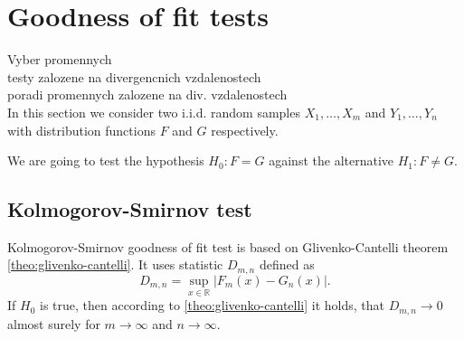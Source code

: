 \chapter{Goodness of fit tests}
\label{ch:GoF}

Vyber promennych \\
testy zalozene na divergencnich vzdalenostech \\
poradi promennych zalozene na div. vzdalenostech\\


In this section we consider two i.i.d. random samples $X_1,\ldots, X_m$ and $Y_1, \ldots, Y_n$ with distribution functions $F$ and $G$ respectively. 

We are going to test the hypothesis $H_0: F = G$ against the alternative $H_1: F \neq G$. 
\section{Kolmogorov-Smirnov test}
Kolmogorov-Smirnov goodness of fit test is based on Glivenko-Cantelli theorem \ref{theo:glivenko-cantelli}. It uses statistic $D_{m,n}$ defined as 
\begin{equation}
D_{m,n} = \sup_{x \in \mathbb{R}} |F_m(x) - G_n(x)|.
\end{equation}
If $H_0$ is true, then according to \ref{theo:glivenko-cantelli} it holds, that $D_{m,n} \rightarrow 0$ almost surely for $m \rightarrow \infty$ and $n \rightarrow \infty$. 


